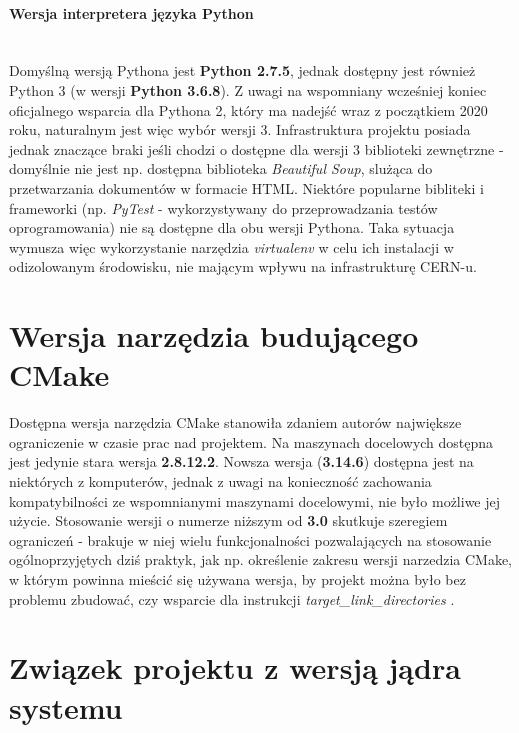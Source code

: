 \paragraph*{Wersja interpretera języka Python}\mbox{}\\
Domyślną wersją Pythona jest \textbf{Python 2.7.5}, jednak dostępny jest również Python 3 (w wersji \textbf{Python 3.6.8}). Z uwagi na wspomniany wcześniej koniec oficjalnego wsparcia dla Pythona 2, który ma nadejść wraz z początkiem 2020 roku, naturalnym jest więc wybór wersji 3. Infrastruktura projektu posiada jednak znaczące braki jeśli chodzi o dostępne dla wersji 3 biblioteki zewnętrzne - domyślnie nie jest np. dostępna biblioteka \textit{Beautiful Soup}, slużąca do przetwarzania dokumentów w formacie HTML. Niektóre popularne bibliteki i frameworki (np. \textit{PyTest} - wykorzystywany do przeprowadzania testów oprogramowania) nie są dostępne dla obu wersji Pythona. Taka sytuacja wymusza więc wykorzystanie narzędzia \textit{virtualenv} w celu ich instalacji w odizolowanym środowisku, nie mającym wpływu na infrastrukturę CERN-u.

\section{Wersja narzędzia budującego CMake}
Dostępna wersja narzędzia CMake stanowiła zdaniem autorów największe ograniczenie w czasie prac nad projektem. Na maszynach docelowych dostępna jest jedynie stara wersja \textbf{2.8.12.2}. Nowsza wersja (\textbf{3.14.6}) dostępna jest na niektórych z komputerów, jednak z uwagi na konieczność zachowania kompatybilności ze wspomnianymi maszynami docelowymi, nie było możliwe jej użycie. Stosowanie wersji o numerze niższym od \textbf{3.0} skutkuje szeregiem ograniczeń - brakuje w niej wielu funkcjonalności pozwalających na stosowanie ogólnoprzyjętych dziś praktyk, jak np. określenie zakresu wersji narzedzia CMake, w którym powinna mieścić się używana wersja, by projekt można było bez problemu zbudować, czy wsparcie dla instrukcji \textit{target\_link\_directories} \cite{NewInCMake}.

\section{Związek projektu z wersją jądra systemu}



